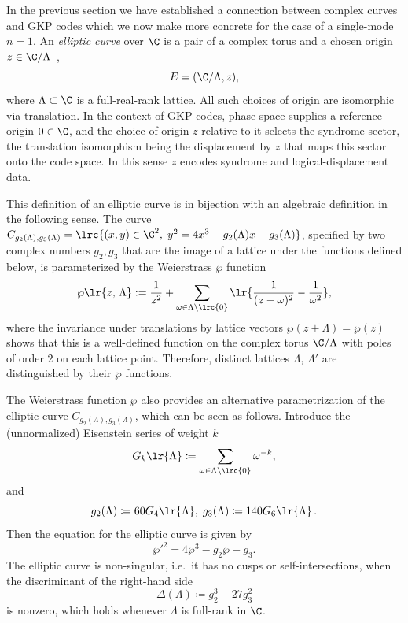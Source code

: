 \documentclass[a4paper, aps, pra, 11pt, onecolumn, tightenlines, superscriptaddress]{revtex4-2}
\begin{document}
In the previous section we have established a connection between complex curves and GKP codes which we now make more concrete for the case of a single-mode $n=1$. 
An \emph{elliptic curve} over $\C$ is a pair of a complex torus and a chosen origin $z\in\C/\Lambda$~\cite[Def.~1.1]{hain2014lectures}, 
\begin{equation}
    E=(\C/\Lambda, z),
\end{equation}
where $\Lambda \subset \C$ is a full-real-rank lattice. All such choices of origin are isomorphic via translation. In the context of GKP codes, phase space supplies a reference origin $0\in\C$, and the choice of origin $z$ relative to it selects the syndrome sector, the translation isomorphism being the displacement by $z$ that maps this sector onto the code space. In this sense $z$ encodes syndrome and logical-displacement data.

This definition of an elliptic curve is in bijection with an algebraic definition in the following sense. 
The curve $C_{g_2(\Lambda), g_3(\Lambda)}=\lrc{(x, y) \in \C^2, \; y^2=4x^3-g_2(\Lambda)x-g_3(\Lambda) }$, specified by two complex numbers $g_2, g_3$ that are the image of a lattice under the functions defined below, is parameterized by the Weierstrass $\wp$ function
\begin{equation}
    \wp\lr{z,\, \Lambda}:=\frac{1}{z^2}+\sum_{\omega\in \Lambda\setminus\lrc{0}}\lr{\frac{1}{(z-\omega)^2}-\frac{1}{\omega^2}},
\end{equation}
where the invariance under translations by lattice vectors $\wp(z+\Lambda)=\wp(z)$ shows that this is a well-defined function on the complex torus $\C / \Lambda$ with poles of order $2$ on each lattice point. 
Therefore, distinct lattices $\Lambda$, $\Lambda'$ are distinguished by their $\wp$ functions. 

The Weierstrass function $\wp$ also provides an alternative parametrization of the elliptic curve $C_{g_2(\Lambda),g_3(\Lambda)}$, which can be seen as follows. 
Introduce the (unnormalized) Eisenstein series of weight $k$
\begin{equation}
    G_k\lr{\Lambda}\coloneqq\sum_{\omega \in \Lambda\setminus \lrc{0}} \omega^{-k},
\end{equation}
and
\begin{equation}
    g_2(\Lambda)\coloneqq 60G_{4}\lr{\Lambda},\; g_3(\Lambda)\coloneqq 140 G_{6}\lr{\Lambda}\,.
\end{equation}
Then the equation for the elliptic curve is given by~\cite[Thm.~VI.3.5]{Silverman2009} 
\begin{equation}
    \wp'^{2}=4\wp^3-g_2\wp -g_3.
    \label{eq:elliptic_curve}
\end{equation}
The elliptic curve is non-singular, i.e.\ it has no cusps or self-intersections, when the discriminant of the right-hand side  
\begin{equation}
    \Delta(\Lambda) \coloneqq g_2^3-27g_3^2 
\end{equation}
is nonzero, which holds whenever $\Lambda$ is full-rank in $\C$. 
\end{document}
